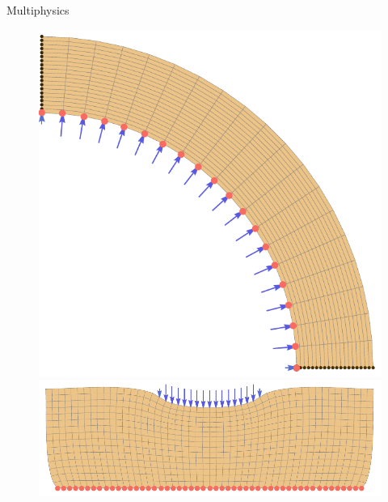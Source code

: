 \documentclass[aspectratio=169,xcolor=dvipsnames]{beamer}
\begin{document}
\begin{frame}{Multiphysics}
\begin{figure}
\begin{minipage}{0.65\linewidth}
\begin{minipage}{0.4\linewidth}
	\includegraphics[width=\linewidth]{circularTest.pdf}
\end{minipage}\hspace{0.1\linewidth}
\begin{minipage}{0.45\linewidth}
	\includegraphics[width=\linewidth]{punchTest.pdf}
\end{minipage}
\end{minipage}
\end{figure}
\end{frame}
\end{document}
